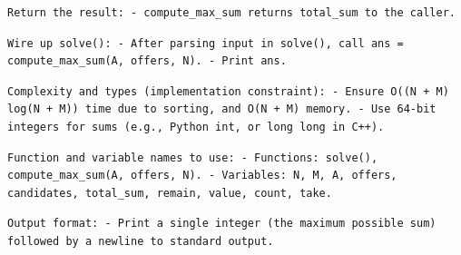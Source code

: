 \documentclass[11pt]{jreport}
\begin{document}
\begin{description}[style=nextline]
  \item[\texttt{要件文6}]\par\noindent
\begin{Verbatim}[breaklines=true,breakanywhere=true]
Return the result: - compute_max_sum returns total_sum to the caller.
\end{Verbatim}

  \item[\texttt{要件文7}]\par\noindent
\begin{Verbatim}[breaklines=true,breakanywhere=true]
Wire up solve(): - After parsing input in solve(), call ans = compute_max_sum(A, offers, N). - Print ans.
\end{Verbatim}

  \item[\texttt{要件文8}]\par\noindent
\begin{Verbatim}[breaklines=true,breakanywhere=true]
Complexity and types (implementation constraint): - Ensure O((N + M) log(N + M)) time due to sorting, and O(N + M) memory. - Use 64-bit integers for sums (e.g., Python int, or long long in C++).
\end{Verbatim}

  \item[\texttt{要件文9}]\par\noindent
\begin{Verbatim}[breaklines=true,breakanywhere=true]
Function and variable names to use: - Functions: solve(), compute_max_sum(A, offers, N). - Variables: N, M, A, offers, candidates, total_sum, remain, value, count, take.
\end{Verbatim}

  \item[\texttt{要件文10}]\par\noindent
\begin{Verbatim}[breaklines=true,breakanywhere=true]
Output format: - Print a single integer (the maximum possible sum) followed by a newline to standard output.
\end{Verbatim}
\end{description}
\end{document}
